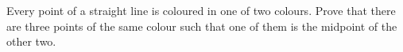Every point of a straight line is coloured in one of two colours. Prove that there are three points of the same colour such that one of them is the midpoint of the other two.
